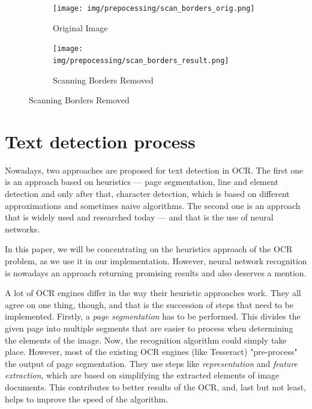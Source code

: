 \begin{figure}[H]
\hspace*{\fill} %
\begin{subfigure}{0.31\textwidth}
\texttt{[image: img/prepocessing/scan\_borders\_orig.png]}
\caption{Original Image} \label{fig:1a}
\end{subfigure}
\hspace*{\fill} %
\begin{subfigure}{0.31\textwidth}
\texttt{[image: img/prepocessing/scan\_borders\_result.png]}
\caption{Scanning Borders Removed} \label{fig:1b}
\end{subfigure}
\hspace*{\fill} %
\end{figure}


\section{Text detection process}

Nowadays, two approaches are proposed for text detection in OCR. The first one is an approach based on heuristics --- page segmentation, line and element detection and only after that, character detection, which is based on different approximations and sometimes naive algorithms. The second one is an approach that is widely used and researched today --- and that is the use of neural networks.

In this paper, we will be concentrating on the heuristics approach of the OCR problem, as we use it in our implementation. However, neural network recognition is nowadays an approach returning  promising results and also deserves a mention.

A lot of OCR engines differ in the way their heuristic approaches work. They all agree on one thing, though, and that is the succession of steps that need to be implemented. Firstly, a \emph{page segmentation} has to be performed. This divides the given page into multiple segments that are easier to process when determining the elements of the image. Now, the recognition algorithm could simply take place. However, most of the existing OCR engines (like Tesseract) "pre-process" the output of page segmentation. They use steps like \emph{representation} and \emph{feature extraction}, which are based on simplifying the extracted elements of image documents. This contributes to better results of the OCR, and, last but not least, helps to improve the speed of the algorithm.

